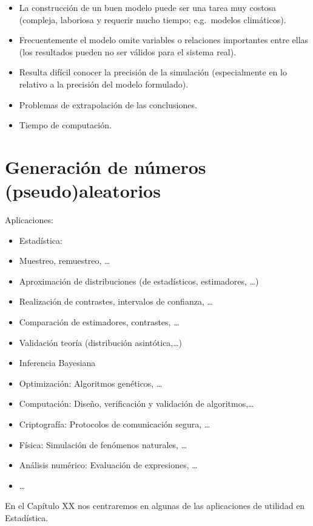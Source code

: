 \documentclass[]{book}
\theoremstyle{definition}
\theoremstyle{definition}
\theoremstyle{definition}
\theoremstyle{remark}
\begin{document}
\begin{itemize}
\item
  La construcción de un buen modelo puede ser una tarea muy costosa
  (compleja, laboriosa y requerir mucho tiempo; e.g.~modelos
  climáticos).
\item
  Frecuentemente el modelo omite variables o relaciones importantes
  entre ellas (los resultados pueden no ser válidos para el sistema
  real).
\item
  Resulta difícil conocer la precisión de la simulación (especialmente
  en lo relativo a la precisión del modelo formulado).
\item
  Problemas de extrapolación de las conclusiones.
\item
  Tiempo de computación.
\end{itemize}

\section{Generación de números
(pseudo)aleatorios}\label{generacion-de-numeros-pseudoaleatorios}

Aplicaciones:

\begin{itemize}
\item
  Estadística:
\item
  Muestreo, remuestreo, \ldots{}
\item
  Aproximación de distribuciones (de estadísticos, estimadores,
  \ldots{})
\item
  Realización de contrastes, intervalos de confianza, \ldots{}
\item
  Comparación de estimadores, contrastes, \ldots{}
\item
  Validación teoría (distribución asintótica,\ldots{})
\item
  Inferencia Bayesiana
\item
  Optimización: Algoritmos genéticos, \ldots{}
\item
  Computación: Diseño, verificación y validación de algoritmos,\ldots{}
\item
  Criptografía: Protocolos de comunicación segura, \ldots{}
\item
  Física: Simulación de fenómenos naturales, \ldots{}
\item
  Análisis numérico: Evaluación de expresiones, \ldots{}
\item
  \ldots{}
\end{itemize}

En el Capítulo XX nos centraremos en algunas de las aplicaciones de
utilidad en Estadística.
\end{document}
